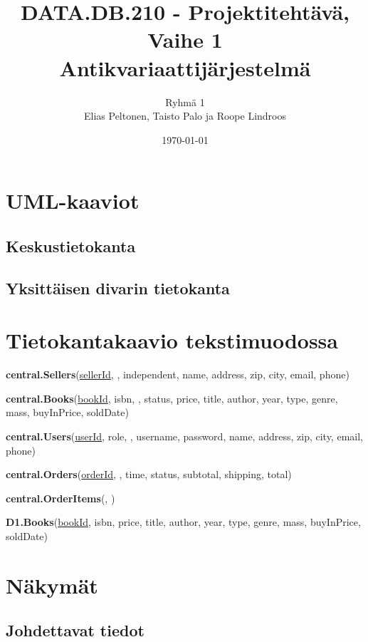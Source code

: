 \documentclass[11pt,a4paper]{article}
\title{DATA.DB.210 - Projektitehtävä, Vaihe 1 \\ \large Antikvariaattijärjestelmä}
\author{Ryhmä 1 \\ \small Elias Peltonen, Taisto Palo ja Roope Lindroos}
\date{\today}
\begin{document}
\maketitle
\newpage

\tableofcontents
\newpage

\section{UML-kaaviot}

\subsection{Keskustietokanta}



\subsection{Yksittäisen divarin tietokanta}



\section{Tietokantakaavio tekstimuodossa}

\small{
	\textbf{central.Sellers}(\underline{sellerId}, , independent, name, address, zip, city, email, phone)
	
	\textbf{central.Books}(\underline{bookId}, isbn, , status, price, title, author, year, type, genre, mass, buyInPrice, soldDate)
	
	\textbf{central.Users}(\underline{userId}, role, , username, password, name, address, zip, city, email, phone)
	
	\textbf{central.Orders}(\underline{orderId}, , time, status, subtotal, shipping, total)
	
	\textbf{central.OrderItems}(, )
	
	\textbf{D1.Books}(\underline{bookId}, isbn, price, title, author, year, type, genre, mass, buyInPrice, soldDate)
}


\section{Näkymät}

\subsection{Johdettavat tiedot}
\end{document}
